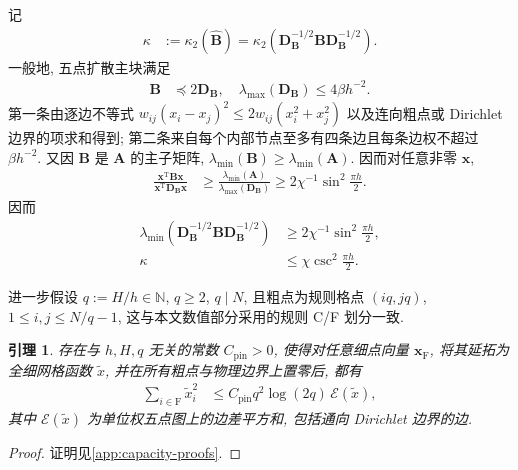 \documentclass{ctexart}
\newcommand{\q}{\quad}
\newcommand{\T}{\mathrm{T}}
\newcommand{\ti}[1]{\widetilde{#1}}
\renewcommand{\ge}{\geqslant}
\renewcommand{\le}{\leqslant}
\newtheorem{lemma}[theorem]{引理}
\begin{document}
记
\begin{align}
    \kappa
    &:=
    \kappa_2(\widehat{\bm B})
    =
    \kappa_2(\bm D_{\bm B}^{-1/2}\bm B\bm D_{\bm B}^{-1/2}).
    \label{eq:jacobi-condition-number}
\end{align}
一般地, 五点扩散主块满足
\begin{align}
    \bm B&\preceq2\bm D_{\bm B},\q
    \lambda_{\max}(\bm D_{\bm B})\le4\beta h^{-2}.
    \label{eq:B-diagonal-comparison}
\end{align}
第一条由逐边不等式
$w_{ij}(x_i-x_j)^2\le2w_{ij}(x_i^2+x_j^2)$
以及连向粗点或 Dirichlet 边界的项求和得到; 第二条来自每个内部节点至多有四条边且每条边权不超过 $\beta h^{-2}$.
又因 $\bm B$ 是 $\bm A$ 的主子矩阵,
$\lambda_{\min}(\bm B)\ge\lambda_{\min}(\bm A)$. 因而对任意非零 $\bm x$,
\begin{align}
    \frac{\bm x^\T\bm B\bm x}{\bm x^\T\bm D_{\bm B}\bm x}
    &\ge
    \frac{\lambda_{\min}(\bm A)}{\lambda_{\max}(\bm D_{\bm B})}
    \ge 2\chi^{-1}\sin^2\frac{\pi h}{2}.
    \label{eq:jacobi-general-rayleigh-lower}
\end{align}
因而
\begin{align}
    \lambda_{\min}(\bm D_{\bm B}^{-1/2}\bm B\bm D_{\bm B}^{-1/2})
    &\ge2\chi^{-1}\sin^2\frac{\pi h}{2},
    \label{eq:jacobi-general-lambda-min}\\
    \kappa&\le\chi\csc^2\frac{\pi h}{2}.
    \label{eq:kappa-general-explicit}
\end{align}

进一步假设 $q:=H/h\in\mathbb N$, $q\ge2$, $q\mid N$, 且粗点为规则格点
$(iq,jq)$, $1\le i,j\le N/q-1$, 这与本文数值部分采用的规则 C/F 划分一致.

\begin{lemma}
\label{lem:pinned-poincare}
存在与 $h,H,q$ 无关的常数 $C_{\mathrm{pin}}>0$, 使得对任意细点向量 $\bm x_{\mathrm F}$, 将其延拓为全细网格函数 $\ti x$, 并在所有粗点与物理边界上置零后, 都有
\begin{align}
    \sum_{i\in\mathrm F}\ti x_i^2
    &\le C_{\mathrm{pin}}q^2\log(2q)\,\mathcal E(\ti x),
    \label{eq:pinned-poincare}
\end{align}
其中 $\mathcal E(\ti x)$ 为单位权五点图上的边差平方和, 包括通向 Dirichlet 边界的边.
\end{lemma}

\begin{proof}
证明见\cref{app:capacity-proofs}.
\end{proof}
\end{document}
